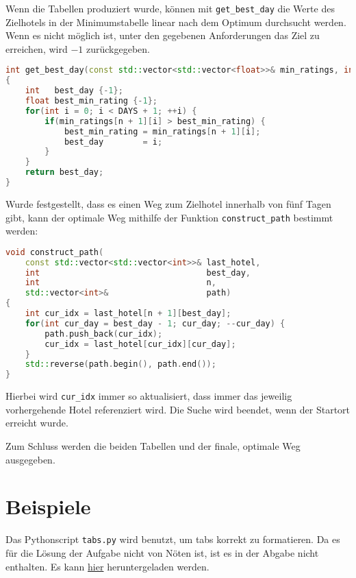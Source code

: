 \documentclass[a4paper,10pt,ngerman]{scrartcl}
\begin{document}
Wenn die Tabellen produziert wurde, können mit \lstinline{get_best_day} die Werte des \glqq{}Zielhotels\grqq{} in der Minimumstabelle linear nach dem Optimum durchsucht werden.
Wenn es nicht möglich ist, unter den gegebenen Anforderungen das Ziel zu erreichen, wird $-1$ zurückgegeben.
\begin{lstlisting}[language=C++]
int get_best_day(const std::vector<std::vector<float>>& min_ratings, int n)
{
    int   best_day {-1};
    float best_min_rating {-1};
    for(int i = 0; i < DAYS + 1; ++i) {
        if(min_ratings[n + 1][i] > best_min_rating) {
            best_min_rating = min_ratings[n + 1][i];
            best_day        = i;
        }
    }
    return best_day;
}
\end{lstlisting}

Wurde festgestellt, dass es einen Weg zum \glqq{}Zielhotel\grqq{} innerhalb von fünf Tagen gibt, kann der optimale Weg mithilfe der Funktion \lstinline{construct_path} bestimmt werden:
\begin{lstlisting}[language=C++]
void construct_path(
    const std::vector<std::vector<int>>& last_hotel,
    int                                  best_day,
    int                                  n,
    std::vector<int>&                    path)
{
    int cur_idx = last_hotel[n + 1][best_day];
    for(int cur_day = best_day - 1; cur_day; --cur_day) {
        path.push_back(cur_idx);
        cur_idx = last_hotel[cur_idx][cur_day];
    }
    std::reverse(path.begin(), path.end());
}
\end{lstlisting}
Hierbei wird \lstinline{cur_idx} immer so aktualisiert, dass immer das jeweilig vorhergehende Hotel referenziert wird.
Die Suche wird beendet, wenn der Startort erreicht wurde.

Zum Schluss werden die beiden Tabellen und der finale, optimale Weg ausgegeben.

\section{Beispiele}
Das Pythonscript \lstinline{tabs.py} wird benutzt, um tabs korrekt zu formatieren.
Da es für die Lösung der Aufgabe nicht von Nöten ist, ist es in der Abgabe nicht enthalten.
Es kann \href{https://gist.github.com/christopher-besch/d88a059a621e3e4a26983b3db576e48d}{hier} heruntergeladen werden.
\end{document}
